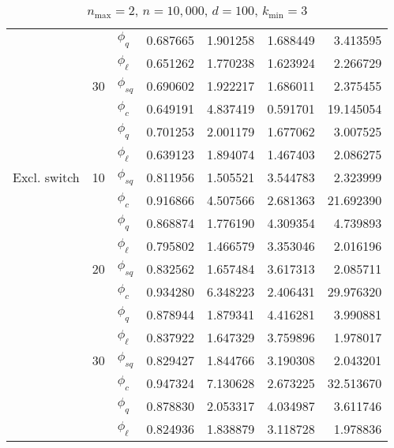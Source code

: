 \begin{table}[]
\begin{tabular}{l@{\hskip 12pt}l@{\hskip 12pt}l@{\hskip 12pt}r@{\hskip 12pt}r@{\hskip 12pt}r@{\hskip 12pt}r}
            &    &$\phi_{q}$ &  0.687665 &  1.901258 &    1.688449 &   3.413595 \\
            &    &$\phi_{\ell}$ &  0.651262 &  1.770238 &    1.623924 &   2.266729 \\\cmidrule{2-7}
            & 30 &$\phi_{sq}$ &  0.690602 &  1.922217 &    1.686011 &   2.375455 \\
            &    &$\phi_{c}$ &  0.649191 &  4.837419 &    0.591701 &  19.145054 \\
            &    &$\phi_{q}$ &  0.701253 &  2.001179 &    1.677062 &   3.007525 \\
            &    &$\phi_{\ell}$ &  0.639123 &  1.894074 &    1.467403 &   2.086275 \\\midrule
Excl. switch & 10 &$\phi_{sq}$ &  0.811956 &  1.505521 &    3.544783 &   2.323999 \\
            &    &$\phi_{c}$ &  0.916866 &  4.507566 &    2.681363 &  21.692390 \\
            &    &$\phi_{q}$ &  0.868874 &  1.776190 &    4.309354 &   4.739893 \\
            &    & $\phi_{\ell}$ &  0.795802 &  1.466579 &    3.353046 &   2.016196 \\\cmidrule{2-7}
            & 20 &$\phi_{sq}$ &  0.832562 &  1.657484 &    3.617313 &   2.085711 \\
            &    &$\phi_{c}$ &  0.934280 &  6.348223 &    2.406431 &  29.976320 \\
            &    &$\phi_{q}$ &  0.878944 &  1.879341 &    4.416281 &   3.990881 \\
            &    & $\phi_{\ell}$ &  0.837922 &  1.647329 &    3.759896 &   1.978017 \\\cmidrule{2-7}
            & 30 &$\phi_{sq}$ &  0.829427 &  1.844766 &    3.190308 &   2.043201 \\
            &    &$\phi_{c}$ &  0.947324 &  7.130628 &    2.673225 &  32.513670 \\
            &    &$\phi_{q}$ &  0.878830 &  2.053317 &    4.034987 &   3.611746 \\
            &    & $\phi_{\ell}$ &  0.824936 &  1.838879 &    3.118728 &   1.978836 \\
\bottomrule
\end{tabular}
    \caption{$n_{\max}=2$, $n=10,\!000$, $d=100$, $k_{\min}=3$}
    \label{tab:eff2}
\end{table}


